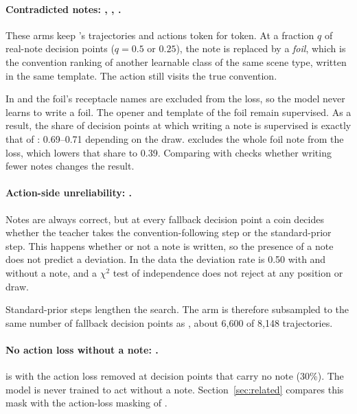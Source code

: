 \paragraph{Contradicted notes: , , .}
These arms keep 's trajectories and actions token for token. At a fraction $q$ of real-note decision points ($q=0.5$ or $0.25$), the note is replaced by a \emph{foil}, which is the convention ranking of another learnable class of the same scene type, written in the same template. The action still visits the true convention.

In  and  the foil's receptacle names are excluded from the loss, so the model never learns to write a foil. The opener and template of the foil remain supervised. As a result, the share of decision points at which writing a note is supervised is exactly that of : 0.69--0.71 depending on the draw.  excludes the whole foil note from the loss, which lowers that share to 0.39. Comparing  with  checks whether writing fewer notes changes the result.

\paragraph{Action-side unreliability: .}
Notes are always correct, but at every fallback decision point a coin decides whether the teacher takes the convention-following step or the standard-prior step. This happens whether or not a note is written, so the presence of a note does not predict a deviation. In the data the deviation rate is 0.50 with and without a note, and a $\chi^2$ test of independence does not reject at any position or draw.

Standard-prior steps lengthen the search. The arm is therefore subsampled to the same number of fallback decision points as , about 6,600 of 8,148 trajectories.

\paragraph{No action loss without a note: .}
 is  with the action loss removed at decision points that carry no note (30\%). The model is never trained to act without a note. Section~\ref{sec:related} compares this mask with the action-loss masking of \citet{liu2026cotgains}.

